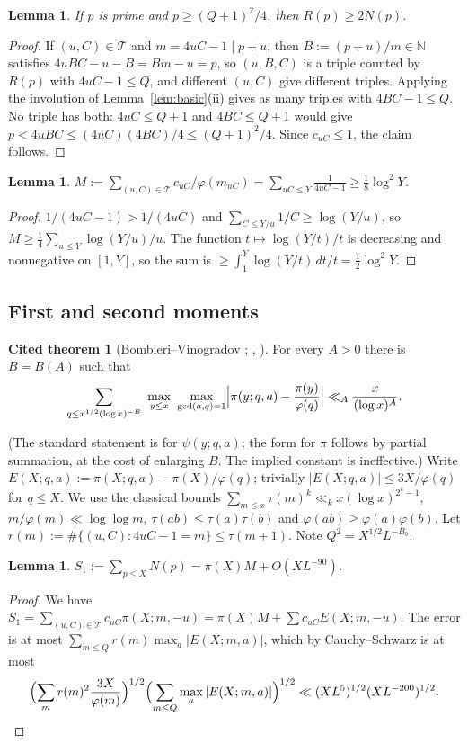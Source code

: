 \documentclass[11pt,reqno]{amsart}
\newtheorem{lemma}[theorem]{Lemma}
\theoremstyle{definition}
\newtheorem{citedthm}[theorem]{Cited theorem}
\newcommand{\N}{\mathbb N}
\newcommand{\cT}{\mathcal T}
\begin{document}
\begin{lemma}\label{lem:trunc}
If $p$ is prime and $p\ge(Q+1)^2/4$, then $R(p)\ge2N(p)$.
\end{lemma}
\begin{proof}
If $(u,C)\in\cT$ and $m=4uC-1\mid p+u$, then $B:=(p+u)/m\in\N$ satisfies
$4uBC-u-B=Bm-u=p$, so $(u,B,C)$ is a triple counted by $R(p)$ with
$4uC-1\le Q$, and different $(u,C)$ give different triples.  Applying the
involution of Lemma~\ref{lem:basic}(ii) gives as many triples with
$4BC-1\le Q$.  No triple has both: $4uC\le Q+1$ and $4BC\le Q+1$ would
give $p<4uBC\le(4uC)(4BC)/4\le(Q+1)^2/4$.  Since $c_{uC}\le1$, the claim
follows.
\end{proof}

\begin{lemma}\label{lem:mean}
$M:=\sum_{(u,C)\in\cT}c_{uC}/\varphi(m_{uC})=\sum_{uC\le Y}\frac1{4uC-1}\ge\frac18\log^2Y$.
\end{lemma}
\begin{proof}
$1/(4uC-1)>1/(4uC)$ and $\sum_{C\le Y/u}1/C\ge\log(Y/u)$, so $M\ge\frac14\sum_{u\le
Y}\log(Y/u)/u$.  The function $t\mapsto\log(Y/t)/t$ is decreasing and
nonnegative on $[1,Y]$, so the sum is $\ge\int_1^Y\log(Y/t)\,dt/t=\frac12\log^2Y$.
\end{proof}

\subsection{First and second moments}
\begin{citedthm}[Bombieri--Vinogradov \cite{Bombieri,AIV}; {\cite[Thm.~17.1]{IK}}, {\cite[Ch.~28]{Davenport}}]\label{cit:bv}
For every $A>0$ there is $B=B(A)$ such that
\[
 \sum_{q\le x^{1/2}(\log x)^{-B}}\ \max_{y\le x}\ \max_{\gcd(a,q)=1}
 \Bigl|\pi(y;q,a)-\frac{\pi(y)}{\varphi(q)}\Bigr|\ll_A\frac{x}{(\log x)^A}.
\]
\end{citedthm}
(The standard statement is for $\psi(y;q,a)$; the form for $\pi$ follows
by partial summation, at the cost of enlarging $B$.  The implied
constant is ineffective.)  Write
$E(X;q,a):=\pi(X;q,a)-\pi(X)/\varphi(q)$;
trivially $|E(X;q,a)|\le3X/\varphi(q)$ for $q\le X$.  We use the
classical bounds $\sum_{m\le x}\tau(m)^k\ll_kx(\log x)^{2^k-1}$,
$m/\varphi(m)\ll\log\log m$, $\tau(ab)\le\tau(a)\tau(b)$ and
$\varphi(ab)\ge\varphi(a)\varphi(b)$.  Let
$r(m):=\#\{(u,C):4uC-1=m\}\le\tau(m+1)$.  Note $Q^2=X^{1/2}L^{-B_0}$.

\begin{lemma}\label{lem:moment1}
$S_1:=\sum_{p\le X}N(p)=\pi(X)M+O(XL^{-90})$.
\end{lemma}
\begin{proof}
We have $S_1=\sum_{(u,C)\in\cT}c_{uC}\pi(X;m,-u)=\pi(X)M+\sum
c_{uC}E(X;m,-u)$.  The error is at most $\sum_{m\le Q}r(m)\max_a|E(X;m,a)|$,
which by Cauchy--Schwarz is at most
\[
 \Bigl(\sum_mr(m)^2\frac{3X}{\varphi(m)}\Bigr)^{1/2}
 \Bigl(\sum_{m\le Q}\max_a|E(X;m,a)|\Bigr)^{1/2}\ll(XL^5)^{1/2}(XL^{-200})^{1/2}.
\]
\end{proof}
\end{document}
